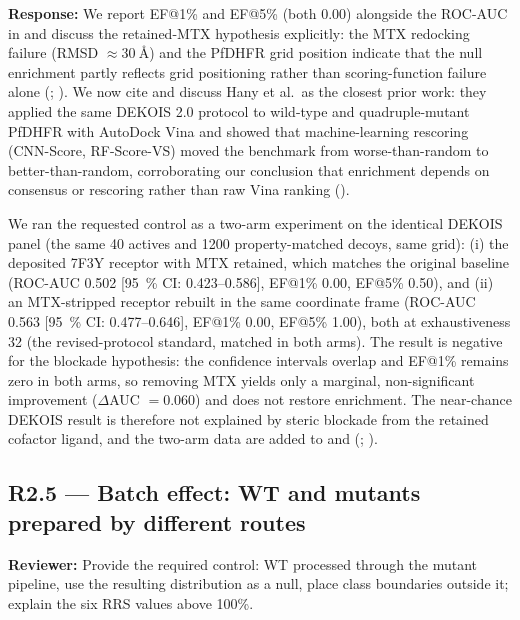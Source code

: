 \documentclass[11pt]{article}
\begin{document}
\textbf{Response:} We report EF@1\% and EF@5\% (both 0.00) alongside the ROC-AUC in
 and discuss the retained-MTX hypothesis explicitly: the MTX redocking failure
(RMSD $\approx \qty{30}{\angstrom}$) and the PfDHFR grid position indicate that the null enrichment partly
reflects grid positioning rather than scoring-function failure alone (; ).
We now cite and discuss Hany et al.\ as the closest prior work: they applied the same DEKOIS
2.0 protocol to wild-type and quadruple-mutant PfDHFR with AutoDock Vina and showed that
machine-learning rescoring (CNN-Score, RF-Score-VS) moved the benchmark from worse-than-random
to better-than-random, corroborating our conclusion that enrichment depends on consensus or
rescoring rather than raw Vina ranking ().

We ran the requested control as a two-arm experiment on the identical DEKOIS
panel (the same \num{40} actives and \num{1200} property-matched decoys, same grid): (i) the deposited 7F3Y
receptor with MTX retained, which matches the original baseline
(ROC-AUC \num{0.502} [\qty{95}{\percent} CI: \numrange{0.423}{0.586}], EF@1\% \num{0.00}, EF@5\% \num{0.50}), and (ii) an MTX-stripped
receptor rebuilt in the same coordinate frame (ROC-AUC \num{0.563} [\qty{95}{\percent} CI: \numrange{0.477}{0.646}],
EF@1\% \num{0.00}, EF@5\% \num{1.00}), both at exhaustiveness \num{32} (the revised-protocol standard, matched
in both arms). The result is negative for the
blockade hypothesis: the confidence intervals overlap and EF@1\% remains zero in both arms, so
removing MTX yields only a marginal, non-significant improvement ($\Delta$AUC $= \num{+0.060}$) and
does not restore enrichment. The near-chance DEKOIS result is therefore not explained by steric blockade from the retained cofactor ligand, and the two-arm data are added to 
and  (; ).

\subsection*{R2.5 --- Batch effect: WT and mutants prepared by different routes}
\textbf{Reviewer:} Provide the required control: WT processed through the mutant pipeline,
use the resulting distribution as a null, place class boundaries outside it; explain the six
RRS values above 100\%.
\end{document}
